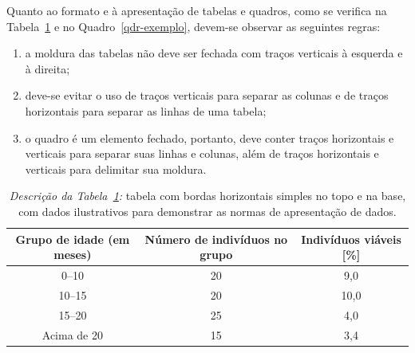 \documentclass[12pt, a4paper]{article}
\begin{document}
Quanto ao formato e à apresentação de tabelas e quadros, como se verifica na Tabela~\ref{tbl-exemplo} e no Quadro~\ref{qdr-exemplo}, devem-se observar as seguintes regras:

\begin{enumerate}[label=\alph*)]
	\item a moldura das tabelas não deve ser fechada com traços verticais à esquerda e à direita;
	\item deve-se evitar o uso de traços verticais para separar as colunas e de traços horizontais para separar as linhas de uma tabela;
	\item o quadro é um elemento fechado, portanto, deve conter traços horizontais e verticais para separar suas linhas e colunas, além de traços horizontais e verticais para delimitar sua moldura.
\end{enumerate}

\begin{table}[h]
	\fontsize{10}{12}
	\centering
	\caption{Exemplo de formatação de uma tabela para a apresentação de resultados}
	\label{tbl-exemplo}
	\begin{tabular}{c c c}
		\textbf{Grupo de idade (em meses)} & \textbf{Número de indivíduos no grupo} & \textbf{Indivíduos viáveis [\%]} \\
		\hline
		0--10		& 20	& 9,0  \\
		10--15		& 20	& 10,0 \\
		15--20		& 25	& 4,0  \\
		Acima de 20	& 15	& 3,4  \\
		\hline
	\end{tabular}
	\vspace{5pt}
	\caption*{Fonte: Produção do(a) próprio(a) autor(a).}
	\caption*{\textit{Descrição da Tabela~\ref{tbl-exemplo}:} tabela com bordas horizontais simples no topo e na base, com dados ilustrativos para demonstrar as normas de apresentação de dados.}
\end{table}
\end{document}
